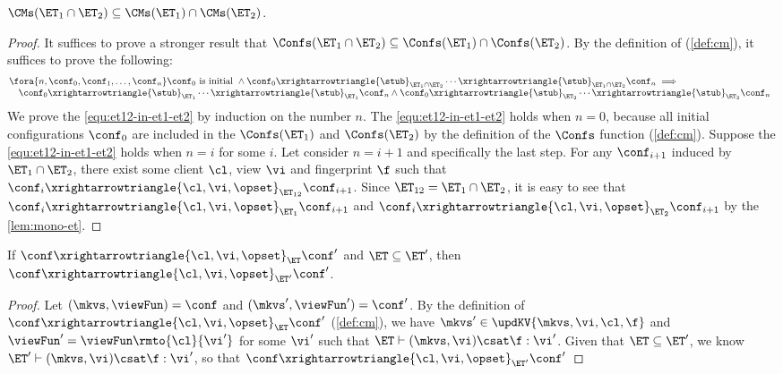\begin{lemma}
\label{lem:et12-in-et1-et2}
\( \CMs(\ET_{1} \cap \ET_{2}) \subseteq \CMs(\ET_1) \cap \CMs(\ET_2) \).
\end{lemma}
\begin{proof}
It suffices to prove a stronger result that \( \Confs(\ET_{1} \cap \ET_{2}) \subseteq \Confs(\ET_1) \cap \Confs(\ET_2) \).
By the definition of \Confs (\cref{def:cm}), it suffices to prove the following:
\begin{equation}
    \label{equ:et12-in-et1-et2}
    \begin{array}{@{}l}
    \fora{n,\conf_0, \conf_1, \dots, \conf_n} \conf_0 \text{ is initial } 
    \land \conf_0 \xrightarrowtriangle{\stub}_{\ET_1 \cap \ET_2} \cdots \xrightarrowtriangle{\stub}_{\ET_1 \cap \ET_2} \conf_n \implies {} \\
    \quad \conf_0 \xrightarrowtriangle{\stub}_{\ET_{1}} \cdots \xrightarrowtriangle{\stub}_{\ET_{1}} \conf_n \land \conf_0 \xrightarrowtriangle{\stub}_{\ET_{2}} \cdots \xrightarrowtriangle{\stub}_{\ET_{2}} \conf_n 
    \end{array}
\end{equation}
We prove the \cref{equ:et12-in-et1-et2} by induction on the number \( n \).
 The \cref{equ:et12-in-et1-et2} holds when \( n = 0 \), because all initial configurations \( \conf_0 \) are included in the \( \Confs(\ET_1)\) and \( \Confs(\ET_2) \) by the definition of the \( \Confs \) function (\cref{def:cm}).
 Suppose the \cref{equ:et12-in-et1-et2} holds when \( n = i \) for some \( i \).
Let consider \( n = i + 1 \) and specifically the last step.
For any \( \conf_{i+1} \) induced by \( \ET_{1} \cap \ET_2 \), there exist some client \( \cl \), view \( \vi \) and fingerprint \( \f \) such that \( \conf_i \xrightarrowtriangle{\cl, \vi, \opset}_{\ET_{12}} \conf_{i+1} \).
Since \( \ET_{12} = \ET_1 \cap \ET_2 \), it is easy to see that \( \conf_i \xrightarrowtriangle{\cl, \vi, \opset}_{\ET_{1}} \conf_{i+1} \) and \( \conf_i \xrightarrowtriangle{\cl, \vi, \opset}_{\ET_{2}} \conf_{i+1} \) by the \cref{lem:mono-et}.
\end{proof}

\begin{lemma}
\label{lem:mono-et}
If $\conf \xrightarrowtriangle{\cl, \vi, \opset}_{\ET} \conf'$ and $\ET \subseteq \ET'$, 
then $\conf \xrightarrowtriangle{\cl, \vi, \opset}_{\ET'} \conf'$.
\end{lemma}
\begin{proof}
    Let \((\mkvs, \viewFun)  = \conf \) and \( (\mkvs', \viewFun') = \conf' \).
    By the definition of  $\conf \xrightarrowtriangle{\cl, \vi, \opset}_{\ET} \conf'$ (\cref{def:cm}), we have \(\mkvs' \in \updKV{\mkvs, \vi, \cl, \f}\) and  \( \viewFun' = \viewFun\rmto{\cl}{\vi'} \) for some \( \vi' \) such that \( \ET \vdash (\mkvs, \vi) \csat \f : \vi' \).
    Given that \( \ET \subseteq \ET'\), we know \( \ET' \vdash (\mkvs, \vi) \csat \f : \vi' \), so that $\conf \xrightarrowtriangle{\cl, \vi, \opset}_{\ET'} \conf'$
\end{proof}

